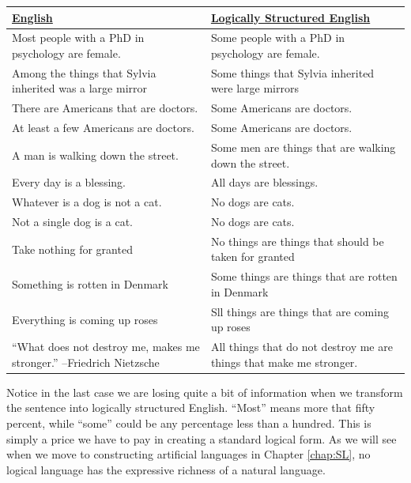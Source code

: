 \begin{longtabu}{p{.5\linewidth}p{.5\linewidth}}
\underline{English} &
\underline{Logically Structured English} \\
\endhead

Most people with a PhD in psychology are female. &
Some people with a PhD in psychology are female. \\

Among the things that Sylvia inherited was a large mirror &
Some things that Sylvia inherited were large mirrors\\

There are Americans that are doctors. &
Some Americans are doctors. \\

At least a few Americans are doctors.&
Some Americans are doctors. \\

A man is walking down the street. &
Some men are things that are walking down the street.\\


Every day is a blessing. &
All days are blessings. \\

Whatever is a dog is not a cat. &
No dogs are cats. \\

Not a single dog is a cat. &
No dogs are cats. \\

Take nothing for granted &
No things are things that should be taken for granted \\

Something is rotten in Denmark &
Some things are things that are rotten in Denmark\\

Everything is coming up roses &
Sll things are things that are coming up roses\\


``What does not destroy me, makes me stronger.'' --Friedrich Nietzsche &
All things that do not destroy me are things that make me stronger. \\


\end{longtabu}

Notice in the last case we are losing quite a bit of information when we transform the sentence into logically structured English. ``Most'' means more that fifty percent, while ``some'' could be any percentage less than a hundred. This is simply a price we have to pay in creating a standard logical form. As we will see when we move to constructing artificial languages in Chapter \ref{chap:SL}, no logical language has the expressive richness of a natural language.

